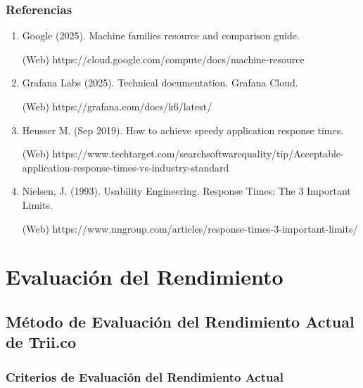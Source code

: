 \documentclass[
  paper=a4,
  ,captions=tableheading
]{scrartcl}
\renewenvironment{quote}{\begin{customblockquote}\list{}{\rightmargin=0em\leftmargin=0em}%
\item\relax\color{blockquote-text}\ignorespaces}{\unskip\unskip\endlist\end{customblockquote}}
\begin{document}
\subsubsection{Referencias}\label{sec:referencias}

\begin{enumerate}
\def\labelenumi{\arabic{enumi}.}
\item
  Google (2025). Machine families resource and comparison guide.

  (Web) https://cloud.google.com/compute/docs/machine-resource
\item
  Grafana Labs (2025). Technical documentation. Grafana Cloud.

  (Web) https://grafana.com/docs/k6/latest/
\item
  Heusser M. (Sep 2019). How to achieve speedy application response
  times.

  (Web)
  https://www.techtarget.com/searchsoftwarequality/tip/Acceptable-application-response-times-vs-industry-standard
\item
  Nielsen, J. (1993). Usability Engineering. Response Times: The 3
  Important Limits.

  (Web)
  https://www.nngroup.com/articles/response-times-3-important-limits/
\end{enumerate}

\newpage

\section{Evaluación del
Rendimiento}\label{sec:evaluaciuxf3n-del-rendimiento}

\subsection{Método de Evaluación del Rendimiento Actual de
Trii.co}\label{sec:muxe9todo-de-evaluaciuxf3n-del-rendimiento-actual-de-trii.co}

\begin{quote}
\end{quote}

\subsubsection{Criterios de Evaluación del Rendimiento
Actual}\label{sec:criterios-de-evaluaciuxf3n-del-rendimiento-actual}
\end{document}
